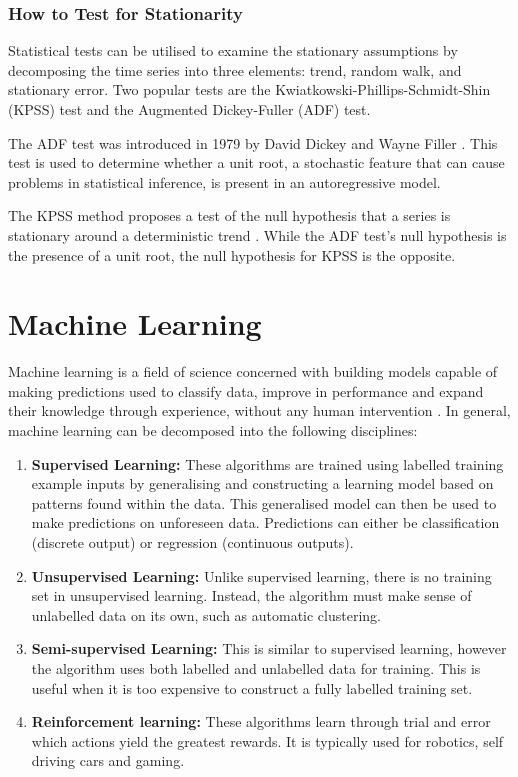 \documentclass{UoYCSproject}
\begin{document}
\subsubsection{How to Test for Stationarity}
Statistical tests can be utilised to examine the stationary assumptions by decomposing the time series into three elements: trend, random walk, and stationary error. Two popular tests are the Kwiatkowski-Phillips-Schmidt-Shin (KPSS) test and the Augmented Dickey-Fuller (ADF) test.

The ADF test was introduced in 1979 by David Dickey and Wayne Filler \cite{dickey1979distribution}. This test is used to determine whether a unit root, a stochastic feature that can cause problems in statistical inference, is present in an autoregressive model. 

The KPSS method proposes a test of the null hypothesis that a series is stationary around a deterministic trend \cite{kwiatkowski1992testing}. While the ADF test's null hypothesis is the presence of a unit root, the null hypothesis for KPSS is the opposite. 

\section{Machine Learning}
Machine learning is a field of science concerned with building models capable of making predictions used to classify data, improve in performance and expand their knowledge through experience, without any human intervention \cite{mitchell1997}. 
In general, machine learning can be decomposed into the following disciplines:

\begin{enumerate}
    \item \textbf{Supervised Learning:} These algorithms are trained using labelled training example inputs by generalising and constructing a learning model based on patterns found within the data. This generalised model can then be used to make predictions on unforeseen data. Predictions can either be classification (discrete output) or regression (continuous outputs). 
    
    \item \textbf{Unsupervised Learning:} Unlike supervised learning, there is no training set in unsupervised learning. Instead, the algorithm must make sense of unlabelled data on its own, such as automatic clustering.
    
    \item \textbf{Semi-supervised Learning:} This is similar to supervised learning, however the algorithm uses both labelled and unlabelled data for training. This is useful when it is too expensive to construct a fully labelled training set. 
    
    \item \textbf{Reinforcement learning:} These algorithms learn through trial and error which actions yield the greatest rewards. It is typically used for robotics, self driving cars and gaming.  
\end{enumerate}
\end{document}
